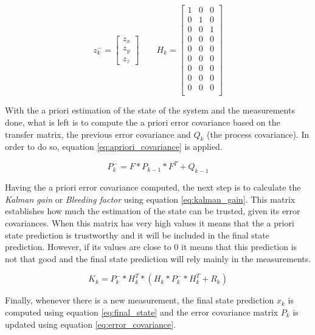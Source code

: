 \begin{equation}
z_{k}^{-}=
\begin{bmatrix}
z_{x} \\ z_{y} \\ z_{z}
\end{bmatrix}
\qquad
H_{k}=
\begin{bmatrix}
1 & 0 & 0 \\
0 & 1 & 0 \\
0 & 0 & 1 \\
0 & 0 & 0 \\
0 & 0 & 0 \\
0 & 0 & 0 \\
0 & 0 & 0 \\
0 & 0 & 0 \\
0 & 0 & 0 \\
\end{bmatrix}
\label{eq:measurements_mats}
\end{equation}

With the a priori estimation of the state of the system and the measurements done, what is left is to compute the a priori error covariance \cite{OReilly} based on the transfer matrix, the previous error covariance and $Q_{k}$ (the process covariance). In order to do so, equation \ref{eq:apriori_covariance} is applied.

\begin{equation}
P_{k}^{-}=F*P_{k-1}*F^{T}+Q_{k-1}
\label{eq:apriori_covariance}
\end{equation}

Having the a priori error covariance computed, the next step is to calculate the \emph{Kalman gain} or \emph{Bleeding factor} using equation \ref{eq:kalman_gain}. This matrix establishes how much the estimation of the state can be trusted, given its error covariances. When this matrix has very high values it means that the a priori state prediction is trustworthy and it will be included in the final state prediction. However, if its values are close to 0 it means that this prediction is not that good and the final state prediction will rely mainly in the measurements.

\begin{equation}
K_{k}=P_{k}^{-}*H_{k}^{T}*(H_{k}*P_{k}^{-}*H_{k}^{T}+R_{k})
\label{eq:kalman_gain}
\end{equation}

Finally, whenever there is a new measurement, the final state prediction $x_{k}$ is computed using equation \ref{eq:final_state} and the error covariance matrix $P_{k}$ is updated using equation \ref{eq:error_covariance}.

